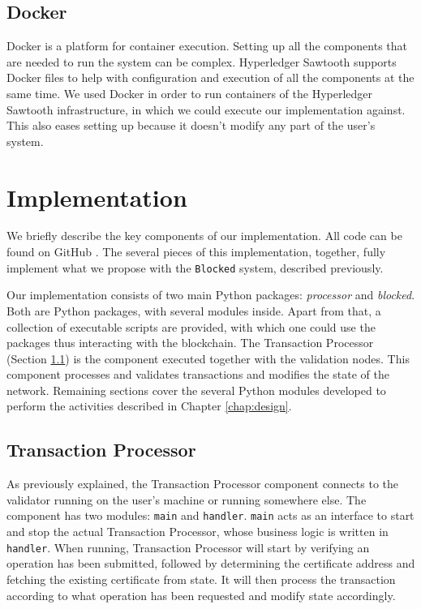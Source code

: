 \subsection{Docker}

Docker is a platform for container execution. Setting up all the components that are needed to run the system can be complex. Hyperledger Sawtooth supports Docker files to help with configuration and execution of all the components at the same time. We used Docker in order to run containers of the Hyperledger Sawtooth infrastructure, in which we could execute our implementation against. This also eases setting up because it doesn't modify any part of the user's system.

\section{Implementation}
\label{sec:implementation-core}

We briefly describe the key components of our implementation. All code can be found on GitHub \cite{blocked}. The several pieces of this implementation, together, fully implement what we propose with the  \texttt{Blocked} system, described previously.

Our implementation consists of two main Python packages: \textit{processor} and \textit{blocked}. Both are Python packages, with several modules inside. Apart from that, a collection of executable scripts are provided, with which one could use the packages thus interacting with the blockchain. The Transaction Processor (Section \ref{sec:implementation-tp}) is the component executed together with the validation nodes. This component processes and validates transactions and modifies the state of the network. Remaining sections cover the several Python modules developed to perform the activities described in Chapter \ref{chap:design}.

\subsection{Transaction Processor}
\label{sec:implementation-tp}

As previously explained, the Transaction Processor component connects to the validator running on the user's machine or running somewhere else. The component has two modules: \texttt{main} and \texttt{handler}. \texttt{main} acts as an interface to start and stop the actual Transaction Processor, whose business logic is written in \texttt{handler}. When running, Transaction Processor will start by verifying an operation has been submitted, followed by determining the certificate address and fetching the existing certificate from state. It will then process the transaction according to what operation has been requested and modify state accordingly.

